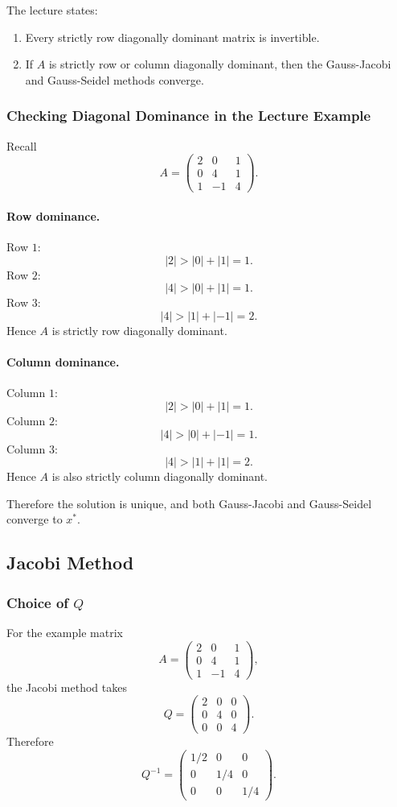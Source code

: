 \documentclass[10pt, letterpaper]{article}
\begin{document}
The lecture states:
\begin{enumerate}
    \item Every strictly row diagonally dominant matrix is invertible.
    \item If \(A\) is strictly row or column diagonally dominant, then the Gauss-Jacobi and Gauss-Seidel methods converge.
\end{enumerate}

\subsubsection{Checking Diagonal Dominance in the Lecture Example}

Recall
\[
A=
\begin{pmatrix}
2&0&1\\
0&4&1\\
1&-1&4
\end{pmatrix}.
\]

\paragraph{Row dominance.}
Row \(1\):
\[
|2|>|0|+|1|=1.
\]
Row \(2\):
\[
|4|>|0|+|1|=1.
\]
Row \(3\):
\[
|4|>|1|+|-1|=2.
\]
Hence \(A\) is strictly row diagonally dominant.

\paragraph{Column dominance.}
Column \(1\):
\[
|2|>|0|+|1|=1.
\]
Column \(2\):
\[
|4|>|0|+|-1|=1.
\]
Column \(3\):
\[
|4|>|1|+|1|=2.
\]
Hence \(A\) is also strictly column diagonally dominant.

Therefore the solution is unique, and both Gauss-Jacobi and Gauss-Seidel converge to \(x^\ast\).

\subsection{Jacobi Method}

\subsubsection{Choice of \(Q\)}

For the example matrix
\[
A=
\begin{pmatrix}
2&0&1\\
0&4&1\\
1&-1&4
\end{pmatrix},
\]
the Jacobi method takes
\[
Q=
\begin{pmatrix}
2&0&0\\
0&4&0\\
0&0&4
\end{pmatrix}.
\]
Therefore
\[
Q^{-1}
=
\begin{pmatrix}
1/2&0&0\\
0&1/4&0\\
0&0&1/4
\end{pmatrix}.
\]
\end{document}
